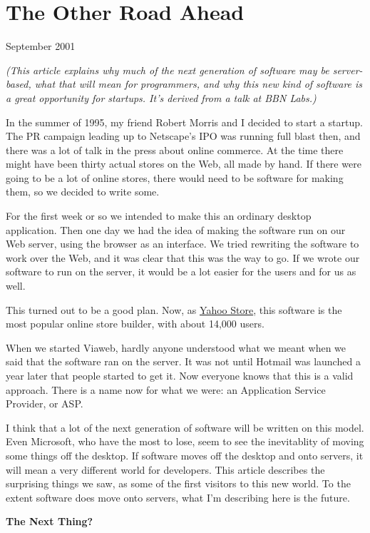 \chapter{The Other Road Ahead}

September 2001

\emph{(This article explains why much of the next generation of software
may be server-based, what that will mean for programmers, and why this
new kind of software is a great opportunity for startups. It's derived
from a talk at BBN Labs.)}

In the summer of 1995, my friend Robert Morris and I decided to start a
startup. The PR campaign leading up to Netscape's IPO was running full
blast then, and there was a lot of talk in the press about online
commerce. At the time there might have been thirty actual stores on the
Web, all made by hand. If there were going to be a lot of online stores,
there would need to be software for making them, so we decided to write
some.

For the first week or so we intended to make this an ordinary desktop
application. Then one day we had the idea of making the software run on
our Web server, using the browser as an interface. We tried rewriting
the software to work over the Web, and it was clear that this was the
way to go. If we wrote our software to run on the server, it would be a
lot easier for the users and for us as well.

This turned out to be a good plan. Now, as
\href{http://store.yahoo.com}{Yahoo Store}, this software is the most
popular online store builder, with about 14,000 users.

When we started Viaweb, hardly anyone understood what we meant when we
said that the software ran on the server. It was not until Hotmail was
launched a year later that people started to get it. Now everyone knows
that this is a valid approach. There is a name now for what we were: an
Application Service Provider, or ASP.

I think that a lot of the next generation of software will be written on
this model. Even Microsoft, who have the most to lose, seem to see the
inevitablity of moving some things off the desktop. If software moves
off the desktop and onto servers, it will mean a very different world
for developers. This article describes the surprising things we saw, as
some of the first visitors to this new world. To the extent software
does move onto servers, what I'm describing here is the future.

\textbf{The Next Thing?}

